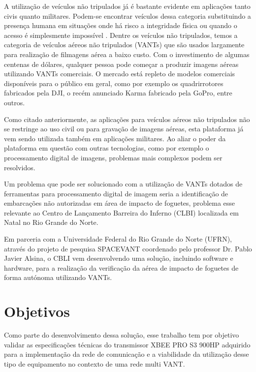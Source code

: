 \label{Cap:introducao}

A utilização de veículos não tripulados já é bastante evidente em aplicações tanto civis quanto militares. Podem-se encontrar veículos dessa categoria substituindo a presença humana em situações onde há risco a integridade física ou quando o acesso é simplesmente impossível \cite{UAVSurveypt1}. Dentre os veículos não tripulados, temos a categoria de veículos aéreos não tripulados (VANTs) que são usados largamente para realização de filmagens aérea a baixo custo. Com o investimento de algumas centenas de dólares, qualquer pessoa pode começar a produzir imagens aéreas utilizando VANTs comerciais. O mercado está repleto de modelos comerciais disponíveis para o público em geral, como por exemplo os quadrirrotores fabricados pela DJI, o recém anunciado Karma fabricado pela GoPro, entre outros.

Como citado anteriormente, as aplicações para veículos aéreos não tripulados não se restringe ao uso civil ou para gravação de imagens aéreas, esta plataforma já vem sendo utilizada também em aplicações militares. Ao aliar o poder da plataforma em questão com outras tecnologias, como por exemplo o processamento digital de imagens, problemas mais complexos podem ser resolvidos. 

Um problema que pode ser solucionado com a utilização de VANTs dotados de ferramentas para processamento digital de imagem seria a identificação de embarcações não autorizadas em área de impacto de foguetes, problema esse relevante ao Centro de Lançamento Barreira do Inferno (CLBI) localizada em Natal no Rio Grande do Norte. 

Em parceria com a Universidade Federal do Rio Grande do Norte (UFRN), através do projeto de pesquisa SPACEVANT coordenado pelo professor Dr. Pablo Javier Alsina, o CBLI vem desenvolvendo uma solução, incluindo software e hardware, para a realização da verificação da aérea de impacto de foguetes de forma autónoma utilizando VANTs. 

\section{Objetivos}

Como parte do desenvolvimento dessa solução, esse trabalho tem por objetivo validar as especificações técnicas do transmissor XBEE PRO S3 900HP adquirido para a implementação da rede de comunicação e a viabilidade da utilização desse tipo de equipamento no contexto de uma rede multi VANT.

